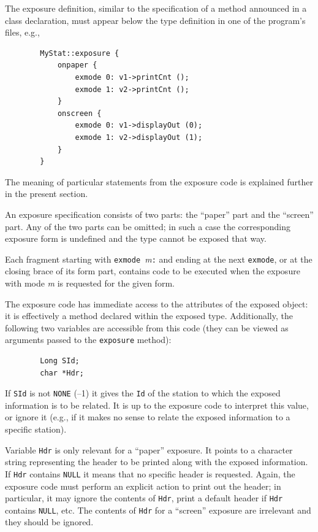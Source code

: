The exposure definition, similar to the specification of a method announced
in a class declaration, must appear below the type definition in one of the
program's files, e.g.,
\begin{verbatim}
        MyStat::exposure {
            onpaper {
                exmode 0: v1->printCnt ();
                exmode 1: v2->printCnt ();
            }
            onscreen {
                exmode 0: v1->displayOut (0);
                exmode 1: v2->displayOut (1);
            }
        }
\end{verbatim}
The meaning of particular statements from the exposure code is explained
further in the present section.

\medskip

\noindent
An exposure specification consists of two parts: the ``paper'' part and the
``screen'' part.
Any of the two parts can be omitted; in such a case the corresponding
exposure form is undefined and the type cannot be exposed that way.

Each fragment starting with {\tt exmode~}{\em m\/}{\tt:}
and ending at the next {\tt exmode},
or at the closing brace of its form part, contains code to be executed when
the exposure with mode {\em m\/} is requested for the given form.

The exposure code has immediate access to the attributes of
the exposed object: it is effectively a method declared within
the exposed type.
Additionally, the following two variables are accessible from this code (they
can be viewed as arguments passed to the {\tt exposure} method):
\begin{verbatim}
        Long SId;
        char *Hdr;
\end{verbatim}

If {\tt SId} is not {\tt NONE} (--1) it gives the {\tt Id} of the station
to which the exposed information is to be related.
It is up to the exposure code to interpret this value, or
ignore it (e.g., if it makes no sense to relate the exposed information to a
specific station).

Variable {\tt Hdr} is only relevant
for a ``paper'' exposure.
It points to a character string
representing the header to be printed along with the exposed information.
If {\tt Hdr} contains {\tt NULL} it means that no specific header is
requested.
Again, the exposure code must perform an explicit action to print out the
header; in particular, it may ignore the contents of {\tt Hdr}, print a
default header if {\tt Hdr} contains {\tt NULL}, etc.
The contents of {\tt Hdr} for a ``screen'' exposure are irrelevant and they
should be ignored.

